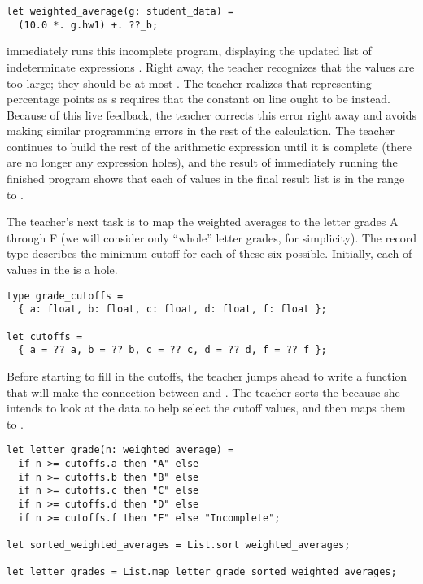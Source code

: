 \begin{lstlisting}
let weighted_average(g: student_data) =
  (10.0 *. g.hw1) +. ??_b;
\end{lstlisting}

\noindent
%
\HazelnutLive{} immediately runs this incomplete program, displaying the updated
list of indeterminate expressions \li{[760.0 + ??_b.1, 880.0 + ??_b.2, ...]}.
%
Right away, the teacher recognizes that the values are too large; they should be
at most .
%
The teacher realizes that representing percentage points as s requires
that the constant on line  ought to be  instead.
%
Because of this live feedback, the teacher corrects this error right away and
avoids making similar programming errors in the rest of the calculation.
%
The teacher continues to build the rest of the arithmetic expression until it is
complete (there are no longer any expression holes), and the result of
immediately running the finished program shows that each of values in the final
result list is in the range  to .

%
The teacher's next task is to map the weighted averages to the letter grades A
through F (we will consider only ``whole'' letter grades, for simplicity).
%
The  record type describes the minimum cutoff for each of
these six possible.
%
Initially, each of values in the  is a hole.

\begin{lstlisting}
type grade_cutoffs =
  { a: float, b: float, c: float, d: float, f: float };

let cutoffs =
  { a = ??_a, b = ??_b, c = ??_c, d = ??_d, f = ??_f };
\end{lstlisting}

\noindent
%
%
Before starting to fill in the cutoffs, the teacher jumps ahead to write a
function  that will make the connection between 
and .
%
The teacher sorts the  because she intends to look at the
data to help select the cutoff values, and then maps them to .

\begin{lstlisting}
let letter_grade(n: weighted_average) =
  if n >= cutoffs.a then "A" else
  if n >= cutoffs.b then "B" else
  if n >= cutoffs.c then "C" else
  if n >= cutoffs.d then "D" else
  if n >= cutoffs.f then "F" else "Incomplete";

let sorted_weighted_averages = List.sort weighted_averages;

let letter_grades = List.map letter_grade sorted_weighted_averages;
\end{lstlisting}

